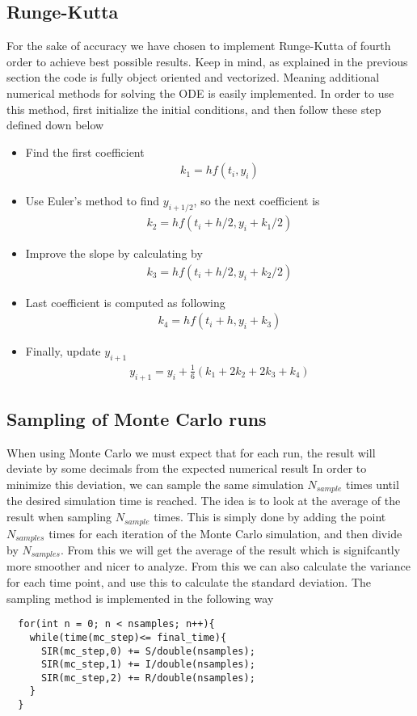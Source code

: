 \documentclass[a4paper, 10pt]{article}
\begin{document}
\subsection{Runge-Kutta} For the sake of accuracy we have chosen to implement Runge-Kutta
of fourth order to achieve best possible results. Keep in mind, as explained in the previous section
the code is fully object oriented and vectorized. Meaning additional numerical methods
for solving the ODE is easily implemented. In order to use this method, first initialize the initial conditions, and
then follow these step defined down below
\begin{itemize}
\item Find the first coefficient
  \begin{align*}
    k_{1} = hf(t_{i},y_{i})
  \end{align*}
\item Use Euler's method to find $y_{i+1/2}$, so the next coefficient is
  \begin{align*}
    k_{2} = hf(t_{i}+h/2, y_{i}+k_{1}/2)
  \end{align*}
\item Improve the slope by calculating by
  \begin{align*}
    k_{3} = hf(t_{i} + h/2, y_{i}+k_{2}/2)
  \end{align*}
\item Last coefficient is computed as following
  \begin{align*}
    k_{4} = hf(t_{i} + h, y_{i} + k_{3})
  \end{align*}
\item Finally, update $y_{i+1}$
  \begin{align*}
    y_{i+1} = y_{i} + \frac{1}{6}\left(k_{1} + 2k_{2} + 2k_{3} + k_{4}\right)
  \end{align*}
\end{itemize}
\subsection{Sampling of Monte Carlo runs} When using Monte Carlo we must expect that
for each run, the result will deviate by some decimals from the expected numerical result
In order to minimize this deviation,
we can sample the same simulation $N_{sample}$ times until the desired simulation time is reached.
The idea is to look at the average of the result when sampling
$N_{sample}$ times. This is simply done by adding the point $N_{samples}$ times for each
iteration of the Monte Carlo simulation, and then divide by $N_{samples}$. From this we will get the average of the result which is
signifcantly more smoother and nicer to analyze.
From this we can also calculate the variance for each time point, and use this
to calculate the standard deviation.  The sampling method is implemented in the following way
\begin{lstlisting}
  for(int n = 0; n < nsamples; n++){
    while(time(mc_step)<= final_time){
      SIR(mc_step,0) += S/double(nsamples);
      SIR(mc_step,1) += I/double(nsamples);
      SIR(mc_step,2) += R/double(nsamples);
    }
  }
\end{lstlisting}
\end{document}

